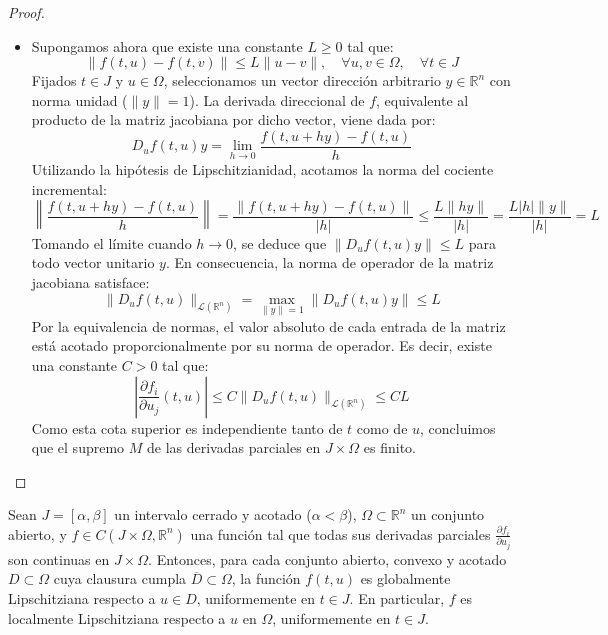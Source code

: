 \begin{proof}
\begin{itemize}
        \item[$\Rightarrow$] Supongamos ahora que existe una constante $L \geq 0$ tal que:
        \[
            \|f(t,u) - f(t,v)\| \leq L \|u - v\|, \quad \forall u, v \in \Omega, \quad \forall t \in J
        \]
        Fijados $t \in J$ y $u \in \Omega$, seleccionamos un vector dirección arbitrario $y \in \mathbb{R}^n$ con norma unidad ($\|y\|=1$). La derivada direccional de $f$, equivalente al producto de la matriz jacobiana por dicho vector, viene dada por:
        \[
            D_u f(t,u) y = \lim_{h \to 0} \frac{f(t, u+hy) - f(t,u)}{h}
        \]
        Utilizando la hipótesis de Lipschitzianidad, acotamos la norma del cociente incremental:
        \[
            \left\| \frac{f(t, u+hy) - f(t,u)}{h} \right\| = \frac{\|f(t, u+hy) - f(t,u)\|}{|h|} \leq \frac{L \|hy\|}{|h|} = \frac{L |h| \|y\|}{|h|} = L
        \]
        Tomando el límite cuando $h \to 0$, se deduce que $\|D_u f(t,u) y\| \leq L$ para todo vector unitario $y$. En consecuencia, la norma de operador de la matriz jacobiana satisface:
        \[
            \|D_u f(t,u)\|_{\mathcal{L}(\mathbb{R}^n)} = \max_{\|y\|=1} \|D_u f(t,u) y\| \leq L
        \]
        Por la equivalencia de normas, el valor absoluto de cada entrada de la matriz está acotado proporcionalmente por su norma de operador. Es decir, existe una constante $C > 0$ tal que:
        \[
            \left| \frac{\partial f_i}{\partial u_j} (t,u) \right| \leq C \|D_u f(t,u)\|_{\mathcal{L}(\mathbb{R}^n)} \leq C L
        \]
        Como esta cota superior es independiente tanto de $t$ como de $u$, concluimos que el supremo $M$ de las derivadas parciales en $J \times \Omega$ es finito.
    \end{itemize}
\end{proof}

\begin{corolario}
    Sean $J = [\alpha, \beta]$ un intervalo cerrado y acotado ($\alpha < \beta$), $\Omega \subset \mathbb{R}^n$ un conjunto abierto, y $f \in C(J \times \Omega, \mathbb{R}^n)$ una función tal que todas sus derivadas parciales $\frac{\partial f_i}{\partial u_j}$ son continuas en $J \times \Omega$. Entonces, para cada conjunto abierto, convexo y acotado $D \subset \Omega$ cuya clausura cumpla $\overline{D} \subset \Omega$, la función $f(t,u)$ es globalmente Lipschitziana respecto a $u \in D$, uniformemente en $t \in J$. En particular, $f$ es localmente Lipschitziana respecto a $u$ en $\Omega$, uniformemente en $t \in J$. 
\end{corolario}

